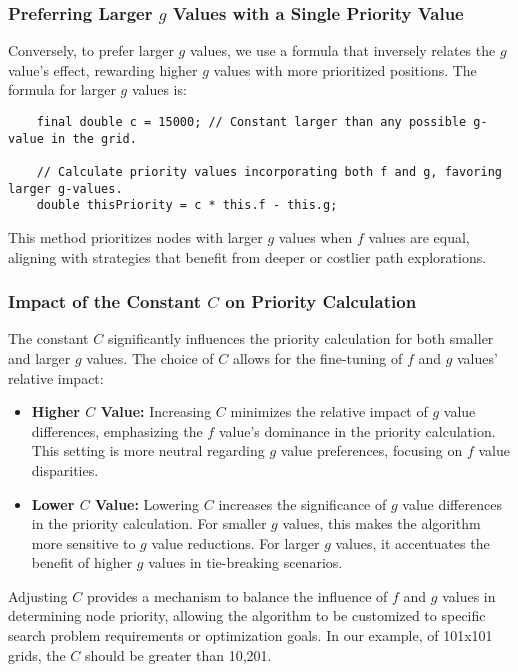 \documentclass{article}
\begin{document}
\subsubsection{Preferring Larger \(g\) Values with a Single Priority Value}
Conversely, to prefer larger \(g\) values, we use a formula that inversely relates the \(g\) value's effect, rewarding higher \(g\) values with more prioritized positions. The formula for larger \(g\) values is:
\begin{verbatim}
    final double c = 15000; // Constant larger than any possible g-value in the grid.
    
    // Calculate priority values incorporating both f and g, favoring larger g-values.
    double thisPriority = c * this.f - this.g;
\end{verbatim}
This method prioritizes nodes with larger \(g\) values when \(f\) values are equal, aligning with strategies that benefit from deeper or costlier path explorations.

\subsubsection{Impact of the Constant \(C\) on Priority Calculation}
The constant \(C\) significantly influences the priority calculation for both smaller and larger \(g\) values. The choice of \(C\) allows for the fine-tuning of \(f\) and \(g\) values' relative impact:
\begin{itemize}
    \item \textbf{Higher \(C\) Value:} Increasing \(C\) minimizes the relative impact of \(g\) value differences, emphasizing the \(f\) value's dominance in the priority calculation. This setting is more neutral regarding \(g\) value preferences, focusing on \(f\) value disparities.
    \item \textbf{Lower \(C\) Value:} Lowering \(C\) increases the significance of \(g\) value differences in the priority calculation. For smaller \(g\) values, this makes the algorithm more sensitive to \(g\) value reductions. For larger \(g\) values, it accentuates the benefit of higher \(g\) values in tie-breaking scenarios.
\end{itemize}

Adjusting \(C\) provides a mechanism to balance the influence of \(f\) and \(g\) values in determining node priority, allowing the algorithm to be customized to specific search problem requirements or optimization goals. In our example, of 101x101 grids, the \(C\) should be greater than 10,201.
\end{document}
